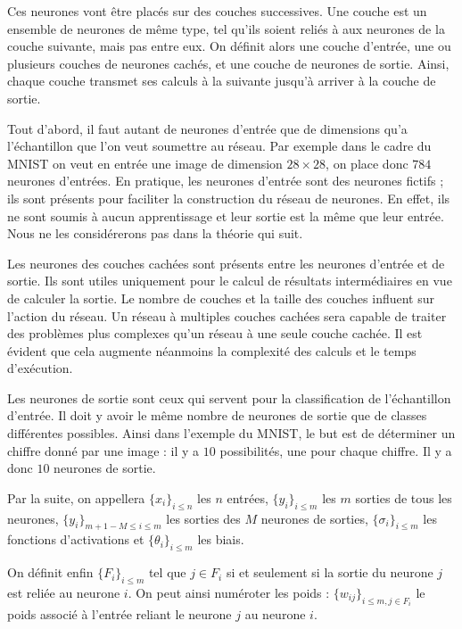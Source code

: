 Ces neurones vont être placés sur des couches successives. Une couche est un ensemble de neurones de même type, tel qu'ils soient reliés à aux neurones de la couche suivante, mais pas entre eux. On définit alors une couche d'entrée, une ou plusieurs couches de neurones cachés, et une couche de neurones de sortie. Ainsi, chaque couche transmet ses calculs à la suivante jusqu'à arriver à la couche de sortie.

\medskip

Tout d'abord, il faut autant de neurones d'entrée que de dimensions qu'a l'échantillon
que l'on veut soumettre au réseau. Par exemple dans le cadre du MNIST
on veut en entrée une image de dimension $28 \times 28$, on place donc $784$
neurones d'entrées. En pratique, les neurones d'entrée sont des neurones fictifs
; ils sont présents pour faciliter la construction du réseau de neurones.
En effet, ils ne sont soumis à aucun apprentissage et leur sortie est la même
que leur entrée. Nous ne les considérerons pas dans la théorie qui suit.

\medskip

Les neurones des couches cachées sont présents entre les neurones d'entrée et de
sortie. Ils sont utiles uniquement pour le calcul de résultats intermédiaires en vue de
calculer la sortie. Le nombre de couches et la taille des couches influent sur l'action
du réseau. Un réseau à multiples couches cachées sera capable de traiter des problèmes plus
complexes qu'un réseau à une seule couche cachée. Il est évident que cela augmente
néanmoins la complexité des calculs et le temps d'exécution.

\medskip

Les neurones de sortie sont ceux qui servent pour la classification de
l'échantillon d'entrée. Il doit y avoir le même
nombre de neurones de sortie que de classes différentes possibles. Ainsi dans
l'exemple du MNIST, le but est de déterminer un chiffre donné par une image :
il y a $10$ possibilités, une pour chaque chiffre. Il y a donc $10$ neurones de
sortie.

\medskip

Par la suite, on appellera $\{x_i\}_{i \leq n}$ les $n$ entrées, $\{y_i\}_{i \leq m}$
 les $m$ sorties de tous les neurones, $\{y_i\}_{m+1-M \leq i \leq m}$ les sorties des
$M$ neurones de sorties, $\{\sigma_i\}_{i \leq m}$ les fonctions d'activations et
$\{\theta_i\}_{i \leq m}$ les biais.

\medskip

On définit enfin $\{F_i\}_{i \leq m}$ tel que $j \in F_i$ si et seulement si la
sortie du neurone $j$ est reliée au neurone $i$. On peut ainsi numéroter les
poids : $\{w_{ij}\}_{i \leq m, j \in F_i} $ le poids associé à l'entrée reliant
le neurone $j$ au neurone $i$.

